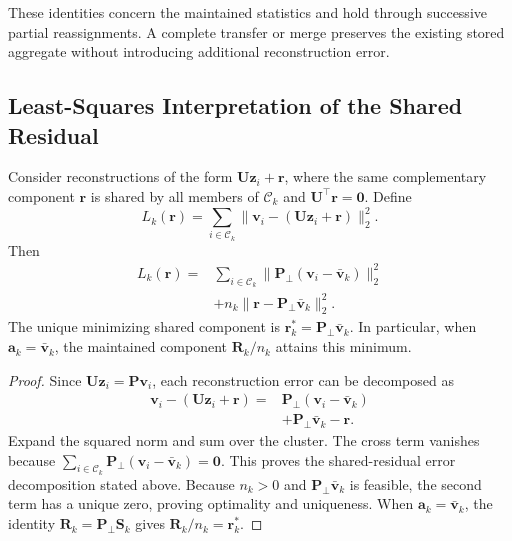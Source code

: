 These identities concern the maintained statistics and hold through
successive partial reassignments.
A complete transfer or merge preserves the existing stored aggregate
without introducing additional reconstruction error.

\subsection{Least-Squares Interpretation of the Shared Residual}
\label{app:vamo-shared-residual}

\begin{proposition}
\label{prop:vamo-shared-residual}
Consider reconstructions of the form
$\mathbf{U}\mathbf{z}_i+\mathbf{r}$, where the same complementary
component $\mathbf{r}$ is shared by all members of $\mathcal{C}_k$
and $\mathbf{U}^{\top}\mathbf{r}=\mathbf{0}$.
Define
\begin{equation*}
    L_k(\mathbf{r})
    =\sum_{i\in\mathcal{C}_k}
      \|\mathbf{v}_i-(\mathbf{U}\mathbf{z}_i+\mathbf{r})\|_2^2.
\end{equation*}
Then
\begin{equation*}
\begin{aligned}
    L_k(\mathbf{r})
    ={}&
    \sum_{i\in\mathcal{C}_k}
      \|\mathbf{P}_{\perp}
      (\mathbf{v}_i-\bar{\mathbf{v}}_k)\|_2^2\\
    &+n_k\|\mathbf{r}
      -\mathbf{P}_{\perp}\bar{\mathbf{v}}_k\|_2^2.
\end{aligned}
\end{equation*}
The unique minimizing shared component is
$\mathbf{r}^{*}_k=\mathbf{P}_{\perp}\bar{\mathbf{v}}_k$.
In particular, when $\mathbf{a}_k=\bar{\mathbf{v}}_k$, the maintained
component $\mathbf{R}_k/n_k$ attains this minimum.
\end{proposition}

\begin{proof}
Since $\mathbf{U}\mathbf{z}_i=\mathbf{P}\mathbf{v}_i$,
each reconstruction error can be decomposed as
\begin{equation*}
\begin{aligned}
    \mathbf{v}_i-(\mathbf{U}\mathbf{z}_i+\mathbf{r})
    ={}&\mathbf{P}_{\perp}(\mathbf{v}_i-\bar{\mathbf{v}}_k)\\
    &+\mathbf{P}_{\perp}\bar{\mathbf{v}}_k-\mathbf{r}.
\end{aligned}
\end{equation*}
Expand the squared norm and sum over the cluster.
The cross term vanishes because
$\sum_{i\in\mathcal{C}_k}
\mathbf{P}_{\perp}(\mathbf{v}_i-\bar{\mathbf{v}}_k)=\mathbf{0}$.
This proves the shared-residual error decomposition stated above.
Because $n_k>0$ and
$\mathbf{P}_{\perp}\bar{\mathbf{v}}_k$ is feasible, the second term
has a unique zero, proving optimality and uniqueness.
When $\mathbf{a}_k=\bar{\mathbf{v}}_k$,
the identity $\mathbf{R}_k=\mathbf{P}_{\perp}\mathbf{S}_k$ gives
$\mathbf{R}_k/n_k=\mathbf{r}^{*}_k$.
\end{proof}

